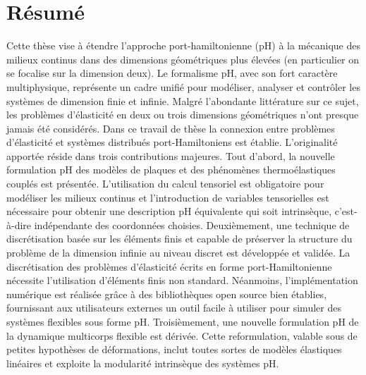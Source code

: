 \chapter*{R\'esum\'e}

Cette thèse vise à étendre l'approche port-hamiltonienne (pH) à la mécanique des milieux continus dans des dimensions géométriques plus élevées (en particulier on se focalise sur la dimension deux). Le formalisme pH, avec son fort caractère multiphysique, représente un cadre unifié pour modéliser, analyser et contrôler les systèmes de dimension finie et infinie. Malgré l'abondante littérature sur ce sujet, les problèmes d'élasticité en deux ou trois dimensions géométriques n'ont presque jamais été considérés. Dans ce travail de thèse la connexion entre problèmes d'élasticité et systèmes distribués port-Hamiltoniens est établie. L'originalité apportée réside dans trois contributions majeures. Tout d'abord, la nouvelle formulation pH des modèles de plaques et des phénomènes thermoélastiques couplés est présentée. L'utilisation du calcul tensoriel est obligatoire pour modéliser les milieux  continus et l'introduction de variables tensorielles est nécessaire pour obtenir une description pH équivalente qui soit intrinsèque, c'est-à-dire indépendante des coordonnées choisies. Deuxièmement, une technique de discrétisation basée sur les éléments finis et capable de préserver la structure du problème de la dimension infinie au niveau discret est développée et validée. La discrétisation des problèmes d'élasticité écrits en forme port-Hamiltonienne nécessite l'utilisation d'éléments finis non standard. Néanmoins, l'implémentation numérique est réalisée grâce à des bibliothèques open source bien établies, fournissant aux utilisateurs externes un outil facile à utiliser pour simuler des systèmes flexibles sous forme pH. Troisièmement, une nouvelle formulation pH de la dynamique multicorps flexible est dérivée. Cette reformulation, valable sous de petites hypothèses de déformations, inclut toutes sortes de modèles élastiques linéaires et exploite la modularité intrinsèque des systèmes pH.
